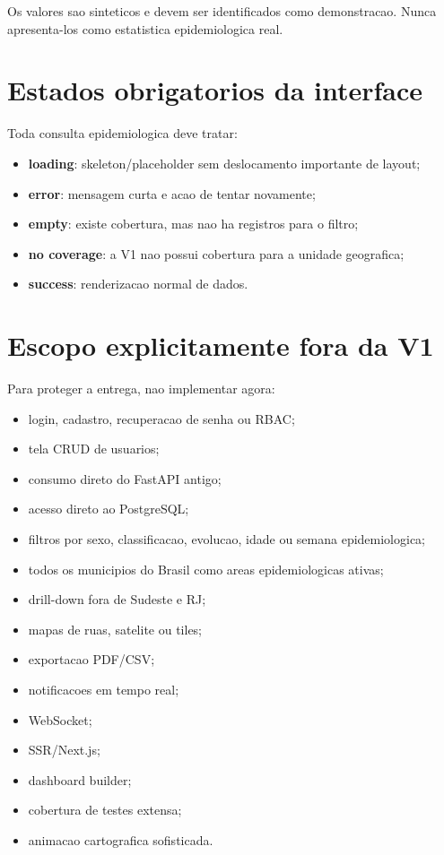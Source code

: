 \documentclass[12pt,a4paper]{article}
\begin{document}
Os valores sao sinteticos e devem ser identificados como demonstracao. Nunca apresenta-los como estatistica epidemiologica real.

\section{Estados obrigatorios da interface}

Toda consulta epidemiologica deve tratar:

\begin{itemize}[leftmargin=*]
    \item \textbf{loading}: skeleton/placeholder sem deslocamento importante de layout;
    \item \textbf{error}: mensagem curta e acao de tentar novamente;
    \item \textbf{empty}: existe cobertura, mas nao ha registros para o filtro;
    \item \textbf{no coverage}: a V1 nao possui cobertura para a unidade geografica;
    \item \textbf{success}: renderizacao normal de dados.
\end{itemize}

\section{Escopo explicitamente fora da V1}

Para proteger a entrega, nao implementar agora:

\begin{itemize}[leftmargin=*]
    \item login, cadastro, recuperacao de senha ou RBAC;
    \item tela CRUD de usuarios;
    \item consumo direto do FastAPI antigo;
    \item acesso direto ao PostgreSQL;
    \item filtros por sexo, classificacao, evolucao, idade ou semana epidemiologica;
    \item todos os municipios do Brasil como areas epidemiologicas ativas;
    \item drill-down fora de Sudeste e RJ;
    \item mapas de ruas, satelite ou tiles;
    \item exportacao PDF/CSV;
    \item notificacoes em tempo real;
    \item WebSocket;
    \item SSR/Next.js;
    \item dashboard builder;
    \item cobertura de testes extensa;
    \item animacao cartografica sofisticada.
\end{itemize}
\end{document}
